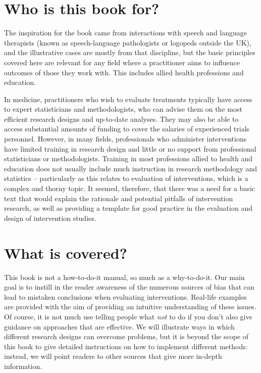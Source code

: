 \documentclass{krantz}
\begin{document}
\hypertarget{who-is-this-book-for}{%
\section*{Who is this book for?}\label{who-is-this-book-for}}

The inspiration for the book came from interactions with speech and language therapists (known as speech-language pathologists or logopeds outside the UK), and the illustrative cases are mostly from that discipline, but the basic principles covered here are relevant for any field where a practitioner aims to influence outcomes of those they work with. This includes allied health professions and education.

In medicine, practitioners who wish to evaluate treatments typically have access to expert statisticians and methodologists, who can advise them on the most efficient research designs and up-to-date analyses. They may also be able to access substantial amounts of funding to cover the salaries of experienced trials personnel. However, in many fields, professionals who administer interventions have limited training in research design and little or no support from professional statisticians or methodologists. Training in most professions allied to health and education does not usually include much instruction in research methodology and statistics -- particularly as this relates to evaluation of interventions, which is a complex and thorny topic. It seemed, therefore, that there was a need for a basic text that would explain the rationale and potential pitfalls of intervention research, as well as providing a template for good practice in the evaluation and design of intervention studies.

\hypertarget{what-is-covered}{%
\section*{What is covered?}\label{what-is-covered}}

This book is not a how-to-do-it manual, so much as a why-to-do-it. Our main goal is to instill in the reader awareness of the numerous sources of bias that can lead to mistaken conclusions when evaluating interventions. Real-life examples are provided with the aim of providing an intuitive understanding of these issues. Of course, it is not much use telling people what \emph{not} to do if you don't also give guidance on approaches that are effective. We will illustrate ways in which different research designs can overcome problems, but it is beyond the scope of this book to give detailed instructions on how to implement different methods: instead, we will point readers to other sources that give more in-depth information.
\end{document}
